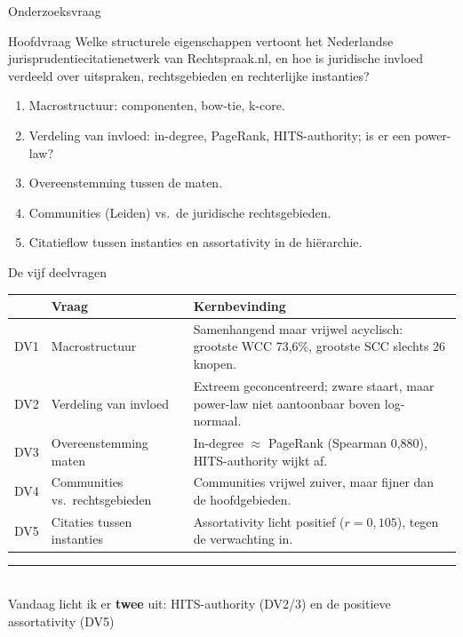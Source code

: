 \documentclass[aspectratio=169,11pt]{beamer}
\newcommand{\rd}[1]{\textcolor{uvared}{#1}}
\begin{document}
\begin{frame}{Onderzoeksvraag}
  \begin{block}{Hoofdvraag}
    Welke \rd{structurele eigenschappen} vertoont het Nederlandse jurisprudentie\-citatienetwerk van Rechtspraak.nl, en hoe is \rd{juridische invloed} verdeeld over uitspraken, rechtsgebieden en rechterlijke instanties?
  \end{block}
  \vspace{0.3em}
  \footnotesize
  \begin{enumerate}
    \item Macrostructuur: componenten, bow-tie, k-core.
    \item Verdeling van invloed: in-degree, PageRank, HITS-authority; is er een power-law?
    \item Overeenstemming tussen de maten.
    \item Communities (Leiden) vs.\ de juridische rechtsgebieden.
    \item Citatieflow tussen instanties en assortativity in de hi\"erarchie.
  \end{enumerate}
\end{frame}

\begin{frame}{De vijf deelvragen}
  \footnotesize
  \renewcommand{\arraystretch}{1.35}
  \begin{tabular}{@{}p{0.5cm} p{4.3cm} p{8.0cm}@{}}
    \toprule
    & \textbf{Vraag} & \textbf{Kernbevinding} \\
    \midrule
    DV1 & Macrostructuur & Samenhangend maar \rd{vrijwel acyclisch}: grootste WCC 73,6\%, grootste SCC slechts 26 knopen. \\
    DV2 & Verdeling van invloed & \rd{Extreem geconcentreerd}; zware staart, maar power-law niet aantoonbaar boven log-normaal. \\
    DV3 & Overeenstemming maten & In-degree $\approx$ PageRank (Spearman 0,880), HITS-authority wijkt af. \\
    DV4 & Communities vs.\ rechtsgebieden & Communities vrijwel zuiver, maar fijner dan de hoofdgebieden. \\
    DV5 & Citaties tussen instanties & Assortativity \rd{licht positief} ($r=0{,}105$), tegen de verwachting in. \\
    \bottomrule
  \end{tabular}
  \vspace{0.6em}

  \centering
  {\color{uvared}\rule{0.6\textwidth}{0.6pt}}\\[0.3em]
  Vandaag licht ik er \textbf{twee} uit: \rd{HITS-authority} (DV2/3) en de \rd{positieve assortativity} (DV5)
\end{frame}
\end{document}
